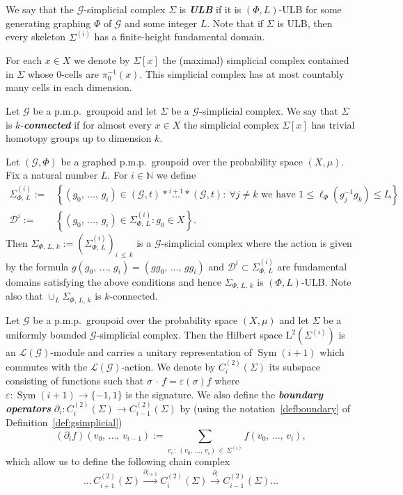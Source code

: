 \documentclass[AHL,Unicode,longabstracts,published]{cedram}
\newcommand{\defin}[1]{\textbf{\emph{#1}}}
\newcommand{\Nmath}{\mathbb{N}}
\newcommand{\cg}{\mathcal{G}}
\newcommand{\cd}{\mathcal{D}}
\newcommand{\LLh}{\mathrm{L}}
\DeclareMathOperator{\Sym}{Sym}
\newcommand{\pmp}{p.m.p.\ }
\newcommand{\lvN}{\mathcal{L}(\cg)}
\let\oldforall\forall
\renewcommand*{\forall}{\mathrel{\oldforall}}
\begin{document}
We say that the $\cg$-simplicial complex $\Sigma$ is
\defin{ULB} if it is $(\Phi,L)$-ULB for some generating graphing $\Phi$ of $\cg$ and some integer $L$. Note that if $\Sigma$ is ULB, then every skeleton $\Sigma^{(i)}$ has a finite-height fundamental domain.


For each $x\in X$ we denote by $\Sigma[x]$ the (maximal) simplicial complex contained in $\Sigma$ whose $0$-cells are $\pi^{-1}_0(x)$. This simplicial complex has at most countably many cells in each dimension.

\begin{defi}
Let $\cg$ be a \pmp groupoid and let $\Sigma$ be a $\cg$-simplicial complex. We say that $\Sigma$ is $k$-\defin{connected} if for almost every $x\in X$ the simplicial complex $\Sigma[x]$ has trivial homotopy groups up to dimension $k$.
\end{defi}

\begin{exam}\label{ex:universal}
Let $(\cg,\Phi)$ be a graphed \pmp groupoid over the probability space $(X,\mu)$. Fix a natural number $L$. For $i\in\Nmath$ we define
\begin{align*}
\Sigma_{\Phi,\,L}^{(i)}:=&\left\{\left(g_0,\,\ldots,\,g_i\right)\in(\cg,t)*\stackrel{i+1}{\ldots}*(\cg,t):\ \forall j\neq k\text{ we have }1\leq \ell_\Phi\left(g_j^{-1}g_k\right)\leq L\right\},\\
\cd^i:=&\left\{\left(g_0,\,\ldots,\,g_i\right)\in \Sigma_{\Phi,\,L}^{(i)} : g_0\in X\right\}.
\end{align*}
Then $\Sigma_{\Phi,\,L,\,k}:=(\Sigma_{\Phi,\,L}^{(i)})_{i\,\leq\,k}$ is a $\cg$-simplicial complex where the action is given by the formula $g(g_0,\,\ldots,\,g_i)=(gg_0,\,\ldots,\,gg_i)$ and $\cd^i\subset \Sigma_{\Phi,\,L}^{(i)}$ are fundamental domains satisfying the above conditions and hence $\Sigma_{\Phi,\,L,\,k}$ is $(\Phi,L)$-ULB. Note also that $\cup_L \Sigma_{\Phi,\,L,\,k}$ is $k$-connected.
\end{exam}

Let $\cg$ be a \pmp groupoid over the probability space $(X,\mu)$ and let $\Sigma$ be a uniformly bounded $\cg$-simplicial complex. Then the Hilbert space $\LLh^2(\Sigma^{(i)})$ is an $\lvN$-module and carries a unitary representation of $\Sym(i+1)$ which commutes with the $\lvN$-action. We denote by $C_i^{(2)}(\Sigma)$ its subspace consisting of functions such that $\sigma\,\cdot\,f = \varepsilon(\sigma) f$ where $\varepsilon \colon \Sym(i+1)\to \{-1,1\}$ is the signature. We also define the
\defin{boundary operators} $\partial_i \colon C_i^{(2)}(\Sigma) \to C_{i-1}^{(2)}(\Sigma)$ by (using the notation~\eqref{defboundary} of Definition~\ref{def:gsimplicial})
\begin{equation}\label{eq:def_of_boundary}
(\partial_i f)(v_0,\,\dots,\,v_{i-1}) := \sum_{v_i\,:\,(v_0,\,\dots,\,v_i)\,\in\,\Sigma^{(i)}} f(v_0,\,\dots,\,v_i),
\end{equation}
which allow us to define the following chain complex
\[
\ldots\,C_{i+1}^{(2)}(\Sigma)\stackrel{\partial_{i+1}}{\rightarrow} C_{i}^{(2)}(\Sigma)\stackrel{\partial_{i}}{\rightarrow} C_{i-1}^{(2)}(\Sigma)\ldots
\]
\end{document}

